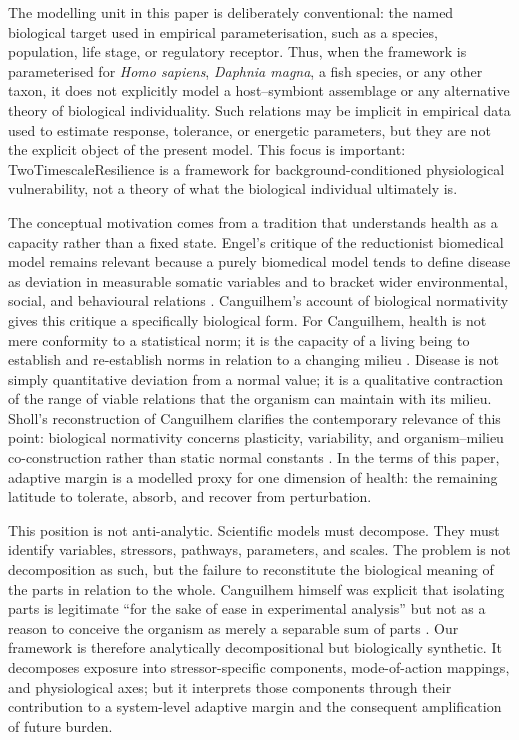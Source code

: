 	The modelling unit in this paper is deliberately conventional: the named biological target used in empirical parameterisation, such as a species, population, life stage, or regulatory receptor. Thus, when the framework is parameterised for \emph{Homo sapiens}, \emph{Daphnia magna}, a fish species, or any other taxon, it does not explicitly model a host--symbiont assemblage or any alternative theory of biological individuality. Such relations may be implicit in empirical data used to estimate response, tolerance, or energetic parameters, but they are not the explicit object of the present model. This focus is important: TwoTimescaleResilience is a framework for background-conditioned physiological vulnerability, not a theory of what the biological individual ultimately is.
	
	The conceptual motivation comes from a tradition that understands health as a capacity rather than a fixed state. Engel's critique of the reductionist biomedical model remains relevant because a purely biomedical model tends to define disease as deviation in measurable somatic variables and to bracket wider environmental, social, and behavioural relations \citep{engel1977newmodel}. Canguilhem's account of biological normativity gives this critique a specifically biological form. For Canguilhem, health is not mere conformity to a statistical norm; it is the capacity of a living being to establish and re-establish norms in relation to a changing milieu \citep{canguilhem1991normal,canguilhem2008knowledge}. Disease is not simply quantitative deviation from a normal value; it is a qualitative contraction of the range of viable relations that the organism can maintain with its milieu. Sholl's reconstruction of Canguilhem clarifies the contemporary relevance of this point: biological normativity concerns plasticity, variability, and organism--milieu co-construction rather than static normal constants \citep{sholl2020plastic}. In the terms of this paper, adaptive margin is a modelled proxy for one dimension of health: the remaining latitude to tolerate, absorb, and recover from perturbation.
	
	This position is not anti-analytic. Scientific models must decompose. They must identify variables, stressors, pathways, parameters, and scales. The problem is not decomposition as such, but the failure to reconstitute the biological meaning of the parts in relation to the whole. Canguilhem himself was explicit that isolating parts is legitimate ``for the sake of ease in experimental analysis'' but not as a reason to conceive the organism as merely a separable sum of parts \citep{canguilhem2008knowledge}. Our framework is therefore analytically decompositional but biologically synthetic. It decomposes exposure into stressor-specific components, mode-of-action mappings, and physiological axes; but it interprets those components through their contribution to a system-level adaptive margin and the consequent amplification of future burden.
	
